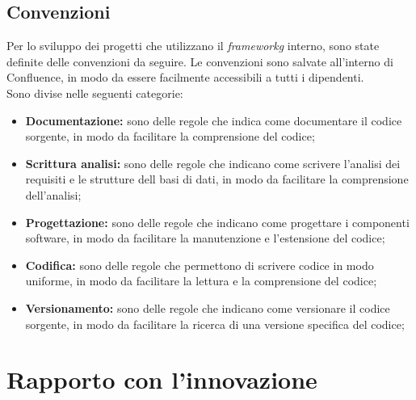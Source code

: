 \subsection{Convenzioni}
Per lo sviluppo dei progetti che utilizzano il \textit{frameworkg} interno, sono state definite delle convenzioni da seguire.
Le convenzioni sono salvate all'interno di Confluence, in modo da essere facilmente accessibili a tutti i dipendenti. \\
Sono divise nelle seguenti categorie:
\begin{itemize}
  \item \textbf{Documentazione:} sono delle regole che indica come documentare il codice sorgente, in modo da facilitare la comprensione del codice;
  \item \textbf{Scrittura analisi:} sono delle regole che indicano come scrivere l'analisi dei requisiti e le strutture dell basi di dati, in modo da facilitare la comprensione dell'analisi;
  \item \textbf{Progettazione:} sono delle regole che indicano come progettare i componenti software, in modo da facilitare la manutenzione e l'estensione del codice;
  \item \textbf{Codifica:} sono delle regole che permettono di scrivere codice in modo uniforme, in modo da facilitare la lettura e la comprensione del codice;
  \item \textbf{Versionamento:} sono delle regole che indicano come versionare il codice sorgente, in modo da facilitare la ricerca di una versione specifica del codice;
\end{itemize}

\newpage
\section{Rapporto con l'innovazione}

